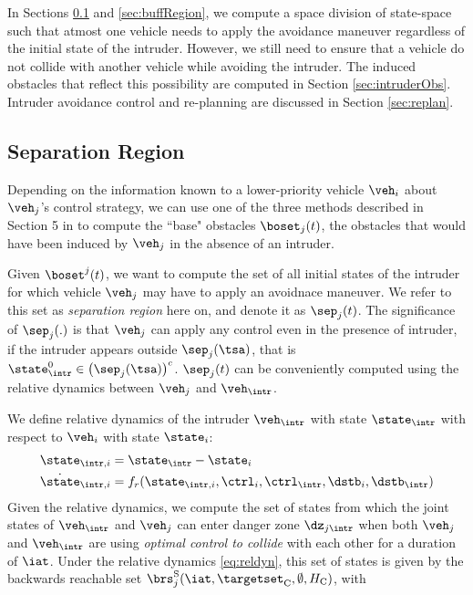 In Sections \ref{sec:sepRegion} and \ref{sec:buffRegion}, we compute a space division of state-space such that atmost one vehicle needs to apply the avoidance maneuver regardless of the initial state of the intruder. However, we still need to ensure that a vehicle do not collide with another vehicle while avoiding the intruder. The induced obstacles that reflect this possibility are computed in Section \ref{sec:intruderObs}. Intruder avoidance control and re-planning are discussed in Section \ref{sec:replan}.

\subsection{Separation Region} \label{sec:sepRegion}
Depending on the information known to a lower-priority vehicle $\veh_i$ about $\veh_j$'s control strategy, we can use one of the three methods described in Section 5 in  to compute the ``base" obstacles $\boset_j(t)$, the obstacles that would have been induced by $\veh_j$ in the absence of an intruder.

Given $\boset^j(t)$, we want to compute the set of all initial states of the intruder for which vehicle $\veh_j$ may have to apply an avoidnace maneuver. We refer to this set as \textit{separation region} here on, and denote it as $\sep_j(t)$. The significance of $\sep_j(.)$ is that $\veh_j$ can apply any control even in the presence of intruder, if the intruder appears outside $\sep_j(\tsa)$, that is $\state_{\intr}^0 \in \left(\sep_j(\tsa)\right)^c$. $\sep_j(t)$ can be conveniently computed using the relative dynamics between $\veh_j$ and $\veh_{\intr}$. 

We define relative dynamics of the intruder $\veh_{\intr}$ with state $\state_\intr$ with respect to $\veh_i$ with state $\state_i$:
\begin{equation}
\label{eq:reldyn}
\begin{aligned}
\state_{\intr, i} &= \state_\intr - \state_i \\
\dot \state_{\intr, i} &= f_r(\state_{\intr, i}, \ctrl_i, \ctrl_\intr, \dstb_i, \dstb_\intr)
\end{aligned}
\end{equation}
Given the relative dynamics, we compute the set of states from which the joint states of $\veh_{\intr}$ and $\veh_{j}$ can enter danger zone $\dz_{j\intr}$ when both $\veh_{j}$ and $\veh_{\intr}$ are using \textit{optimal control to collide} with each other for a duration of $\iat$. Under the relative dynamics \eqref{eq:reldyn}, this set of states is given by the backwards reachable set $\brs^{\text{S}}_j(\iat, \targetset_\text{C}, \emptyset, H_\text{C})$, with

